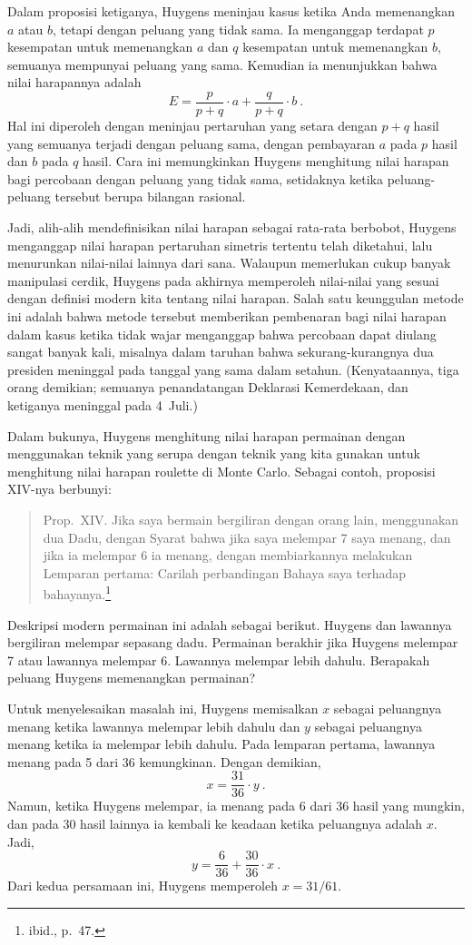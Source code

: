 Dalam proposisi ketiganya, Huygens meninjau kasus ketika Anda memenangkan $a$ atau
$b$, tetapi dengan peluang yang tidak sama. Ia menganggap terdapat $p$ kesempatan
untuk memenangkan $a$ dan $q$ kesempatan untuk memenangkan $b$, semuanya mempunyai
peluang yang sama. Kemudian ia menunjukkan bahwa nilai harapannya adalah
$$ E = \frac p{p + q} \cdot a + \frac q{p + q} \cdot b\ .
$$ Hal ini diperoleh dengan meninjau pertaruhan yang setara dengan $p + q$ hasil yang
semuanya terjadi dengan peluang sama, dengan pembayaran $a$ pada $p$ hasil dan $b$
pada $q$ hasil. Cara ini memungkinkan Huygens menghitung nilai harapan bagi percobaan
dengan peluang yang tidak sama, setidaknya ketika peluang-peluang tersebut berupa
bilangan rasional.
\par
Jadi, alih-alih mendefinisikan nilai harapan sebagai rata-rata berbobot, Huygens
menganggap nilai harapan pertaruhan simetris tertentu telah diketahui, lalu menurunkan
nilai-nilai lainnya dari sana. Walaupun memerlukan cukup banyak manipulasi cerdik,
Huygens pada akhirnya memperoleh nilai-nilai yang sesuai dengan definisi modern kita
tentang nilai harapan. Salah satu keunggulan metode ini adalah bahwa metode tersebut
memberikan pembenaran bagi nilai harapan dalam kasus ketika tidak wajar menganggap
bahwa percobaan dapat diulang sangat banyak kali, misalnya dalam taruhan bahwa
sekurang-kurangnya dua presiden meninggal pada tanggal yang sama dalam setahun.
(Kenyataannya, tiga orang demikian; semuanya penandatangan Deklarasi Kemerdekaan, dan
ketiganya meninggal pada 4~Juli.)
\par
Dalam bukunya, Huygens menghitung nilai harapan permainan dengan menggunakan teknik
yang serupa dengan teknik yang kita gunakan untuk menghitung nilai harapan roulette di
Monte Carlo. Sebagai contoh, proposisi XIV-nya berbunyi:

\begin{quote} Prop.~XIV. Jika saya bermain bergiliran dengan orang lain, menggunakan
dua Dadu, dengan Syarat bahwa jika saya melempar 7 saya menang, dan jika ia melempar 6
ia menang, dengan membiarkannya melakukan Lemparan pertama: Carilah perbandingan
Bahaya saya terhadap bahayanya.\footnote{ibid., p.~47.}
\end{quote}
\par Deskripsi modern permainan ini adalah sebagai berikut. Huygens dan lawannya
bergiliran melempar sepasang dadu. Permainan berakhir jika Huygens melempar 7 atau
lawannya melempar 6. Lawannya melempar lebih dahulu. Berapakah peluang Huygens
memenangkan permainan?
\par Untuk menyelesaikan masalah ini, Huygens memisalkan $x$ sebagai peluangnya menang
ketika lawannya melempar lebih dahulu dan $y$ sebagai peluangnya menang ketika ia
melempar lebih dahulu. Pada lemparan pertama, lawannya menang pada 5 dari 36
kemungkinan. Dengan demikian,
$$ x = \frac {31}{36} \cdot y\ .
$$ Namun, ketika Huygens melempar, ia menang pada 6 dari 36 hasil yang mungkin, dan
pada 30 hasil lainnya ia kembali ke keadaan ketika peluangnya adalah $x$. Jadi,
$$ y = \frac 6{36} + \frac {30}{36} \cdot x\ .
$$ Dari kedua persamaan ini, Huygens memperoleh $x = 31/61$.

